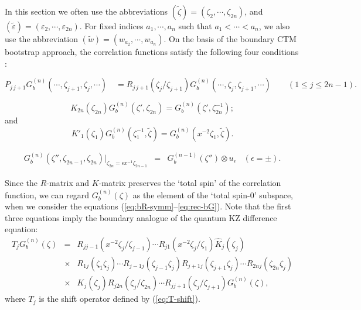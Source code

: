 \documentclass[a4paper,10pt]{article}
\begin{document}
{In this section we often use the abbreviations 
$(\tilde{\zeta})=(\zeta_2 , \cdots , \zeta_{2n})$, and 
$(\tilde{\varepsilon})=(\varepsilon_2 , \cdots , 
\varepsilon_{2n})$. For fixed indices $a_1 , 
\cdots , a_n$ such that $a_1 <\cdots <a_n$, we also use 
the abbreviation $(\tilde{w})=(w_{a_2}, \cdots , w_{a_n})$. 
On the basis of the boundary CTM bootstrap 
approach, the correlation functions satisfy 
the following four conditions \cite{JKKMW}: 

\begin{equation}
P_{j\,j+1} G_{b}^{(n)} 
(\cdots,\zeta_{j+1},\zeta_j,\cdots) 
\quad =
R_{j\,j+1}(\zeta_j/\zeta_{j+1})G_{b}^{(n)} 
(\cdots,\zeta_j,\zeta_{j+1},\cdots)
\qquad (1\leqslant j\leqslant 2n-1). 
\label{eq:bR-symm} 
\end{equation}

\begin{equation}
K_{2n} (\zeta_{2n}) G_{b}^{(n)} (\zeta', \zeta_{2n})
=G_{b}^{(n)} (\zeta', \zeta^{-1}_{2n}); 
\label{eq:RE-1}
\end{equation}
and 
\begin{equation}
K'_{1}(\zeta_1 )
G_{b}^{(n)} ( \zeta_{1}^{-1}, \tilde{\zeta})
=G_{b}^{(n)} (x^{-2}\zeta_{1}, \tilde{\zeta}). 
\label{eq:RE-2}
\end{equation}

\begin{equation}
\begin{array}{rcl}
G_{b}^{(n)} (\zeta'',\zeta_{2n-1}, \zeta_{2n})|_{
\zeta_{2n}=\epsilon x^{-1}\zeta_{2n-1}} &=&
G_{b}^{(n-1)} (\zeta'')\otimes u_\epsilon ~~~~
(\epsilon =\pm). 
\end{array}
\label{eq:rec-bG}
\end{equation}

Since the $R$-matrix and $K$-matrix preserves the 
`total spin' of the correlation function, we can 
regard $G_{b}^{(n)}(\zeta)$ as the element of the 
`total spin-$0$' subspace, when we consider the equations 
(\ref{eq:bR-symm}--\ref{eq:rec-bG}). Note that the first 
three equations imply the boundary analogue of 
the quantum KZ difference equation: 
\begin{equation}
\begin{array}{rcl}
T_j G^{(n)}_b (\zeta ) 
&=& R_{j j-1}(x^{-2}\zeta_j /\zeta_{j-1}) 
\cdots R_{j 1}(x^{-2}\zeta_j /\zeta_{1}) 
\hat{K}_j(\zeta_j ) \\
&\times&
R_{1 j}(\zeta_1 \zeta_{j}) \cdots
R_{j-1 j}(\zeta_{j-1}\zeta_j ) 
R_{j+1 j}(\zeta_{j+1}\zeta_j ) \cdots
R_{2n j}(\zeta_{2n}\zeta_j ) \\
&\times& K_j (\zeta_j ) 
R_{j 2n}(\zeta_j /\zeta_{2n})  \cdots
R_{j j+1}(\zeta_j /\zeta_{j+1})
G^{(n)}_b (\zeta), 
\label{eq:N-diff}
\end{array}
\end{equation}
where $T_j$ is the shift operator defined by 
(\ref{eq:T-shift}). 

}
\end{document}
